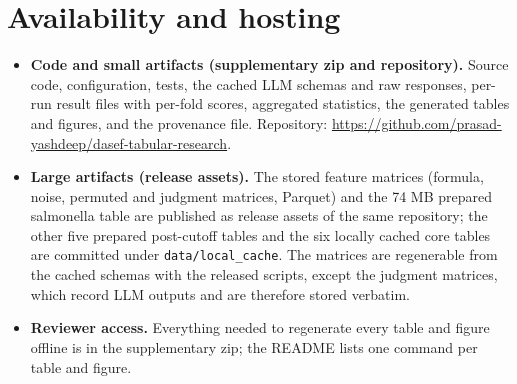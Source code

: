 \documentclass[11pt]{article}
\begin{document}
\section*{Availability and hosting}
\begin{itemize}
\item \textbf{Code and small artifacts (supplementary zip and repository).} Source code, configuration, tests, the cached LLM schemas and raw responses, per-run result files with per-fold scores, aggregated statistics, the generated tables and figures, and the provenance file. Repository: \url{https://github.com/prasad-yashdeep/dasef-tabular-research}.
\item \textbf{Large artifacts (release assets).} The stored feature matrices (formula, noise, permuted and judgment matrices, Parquet) and the 74 MB prepared salmonella table are published as release assets of the same repository; the other five prepared post-cutoff tables and the six locally cached core tables are committed under \texttt{data/local\_cache}. The matrices are regenerable from the cached schemas with the released scripts, except the judgment matrices, which record LLM outputs and are therefore stored verbatim.
\item \textbf{Reviewer access.} Everything needed to regenerate every table and figure offline is in the supplementary zip; the README lists one command per table and figure.
\end{itemize}
\end{document}

